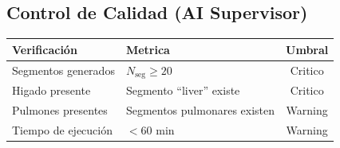 \documentclass[12pt,a4paper]{article}
\begin{document}
\begin{tcolorbox}[aiSupervisor]
\subsection*{Control de Calidad (AI Supervisor)}

\begin{table}[H]
\centering
\begin{tabular}{llc}
\toprule
\textbf{Verificación} & \textbf{Metrica} & \textbf{Umbral} \\
\midrule
Segmentos generados & $N_{\text{seg}} \geq 20$ & Critico \\
Higado presente & Segmento ``liver'' existe & Critico \\
Pulmones presentes & Segmentos pulmonares existen & Warning \\
Tiempo de ejecución & $< 60$ min & Warning \\
\bottomrule
\end{tabular}
\end{table}

\newpage


\newpage


\newpage


\newpage


\newpage


\newpage


\newpage


\newpage

\end{tcolorbox}
\end{document}
